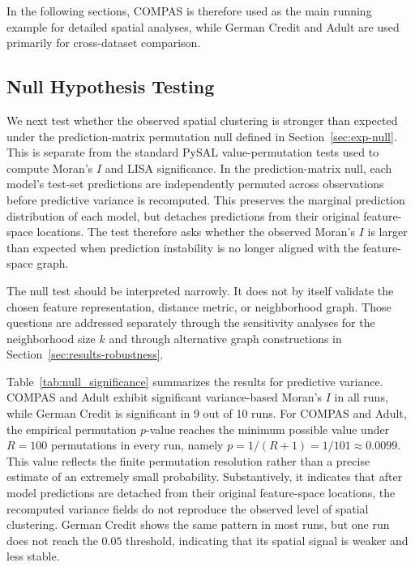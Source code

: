 In the following sections, COMPAS is therefore used as the main running example for detailed 
spatial analyses, while German Credit and Adult are used primarily for cross-dataset comparison.

\subsection{Null Hypothesis Testing}
\label{sec:results-null}

We next test whether the observed spatial clustering is stronger than expected under the
prediction-matrix permutation null defined in Section~\ref{sec:exp-null}. This is separate
from the standard PySAL value-permutation tests used to compute Moran's $I$ and LISA
significance. In the prediction-matrix null, each model's test-set predictions are
independently permuted across observations before predictive variance is recomputed.
This preserves the marginal prediction distribution of each model, but detaches
predictions from their original feature-space locations. The test therefore asks whether
the observed Moran's $I$ is larger than expected when prediction instability is no longer
aligned with the feature-space graph.

The null test should be interpreted narrowly. It does not by itself validate the chosen
feature representation, distance metric, or neighborhood graph. Those questions are
addressed separately through the sensitivity analyses for the neighborhood size $k$ and
through alternative graph constructions in Section~\ref{sec:results-robustness}.

Table~\ref{tab:null_significance} summarizes the results for predictive variance.
COMPAS and Adult exhibit significant variance-based Moran's $I$ in all runs, while
German Credit is significant in 9 out of 10 runs. For COMPAS and Adult, the empirical
permutation $p$-value reaches the minimum possible value under $R=100$ permutations in
every run, namely $p = 1/(R+1) = 1/101 \approx 0.0099$. This value reflects the finite 
permutation resolution rather than a precise estimate of an extremely small probability. 
Substantively, it indicates that after model predictions are detached from their original 
feature-space locations, the recomputed variance fields do not reproduce the observed level 
of spatial clustering. German Credit shows the same pattern in most runs, but one run does
not reach the $0.05$ threshold, indicating that its spatial signal is weaker and less stable.

